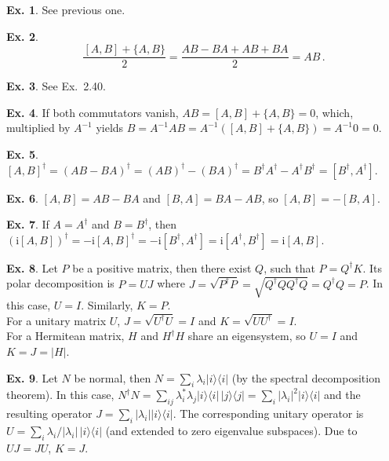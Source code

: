 \documentclass[a4paper,12pt]{article}
\def\imagi{\mathrm{i}}
\theoremstyle{definition}
\newtheorem{exercise}{Ex.}[section]
\begin{document}
\begin{exercise}
 See previous one.
\end{exercise}

\begin{exercise}
 \[
  \frac{[A, B]+\{A, B\}}{2} = \frac{AB-BA+AB+BA}{2}=AB\,.
 \]
\end{exercise}

\begin{exercise}
 See Ex.\ 2.40.
\end{exercise}

\begin{exercise}
 If both commutators vanish, $AB=[A, B]+\{A, B\}=0$, which, multiplied by $A^{-1}$ yields $B=A^{-1}AB=A^{-1}([A, B]+\{A, B\}) = A^{-1}0=0$.
\end{exercise}

\begin{exercise}
 $[A, B]^\dagger = (AB-BA)^\dagger = (AB)^\dagger - (BA)^\dagger = B^\dagger A^\dagger - A^\dagger B^\dagger = [B^\dagger, A^\dagger]$.
\end{exercise}

\begin{exercise}
 $[A, B] = AB-BA$ and  $[B, A]=BA-AB$, so $[A, B]=-[B, A]$.
\end{exercise}

\begin{exercise}
 If $A=A^\dagger$ and $B=B^\dagger$, then $(\imagi [A, B])^\dagger = -\imagi [A, B]^\dagger = -\imagi [B^\dagger, A^\dagger] =\imagi [A^\dagger, B^\dagger]=\imagi [A, B]$.
\end{exercise}

\begin{exercise}
 Let $P$ be a positive matrix, then there exist $Q$, such that $P=Q^\dagger K$. Its polar decomposition is $P=UJ$ where $J=\sqrt{P^\dagger P} = \sqrt{Q^\dagger Q Q^\dagger Q}=Q^\dagger Q=P$. In this case, $U=I$. Similarly, $K=P$.\\
 For a unitary matrix $U$, $J=\sqrt{U^\dagger U}=I$ and $K=\sqrt{UU^\dagger}=I$.\\
 For a Hermitean matrix, $H$ and $H^\dagger H$ share an eigensystem, so $U=I$ and $K=J=|H|$.
\end{exercise}

\begin{exercise}
 Let $N$ be normal, then $N=\sum_i \lambda_i |i\rangle\langle i|$ (by the spectral decomposition theorem). In this case, $N^\dagger N=\sum_{ij}\lambda_i^* \lambda_j |i\rangle\langle i|\,|j\rangle\langle j| = \sum_{i} |\lambda_i|^2 |i\rangle\langle i|$ and the resulting operator $J = \sum_i |\lambda_i| |i\rangle\langle i|$. The corresponding unitary operator is $U = \sum_i \lambda_i/|\lambda_i|\,|i\rangle\langle i|$ (and extended to zero eigenvalue subspaces). Due to $UJ=JU$, $K=J$.
\end{exercise}
\end{document}

